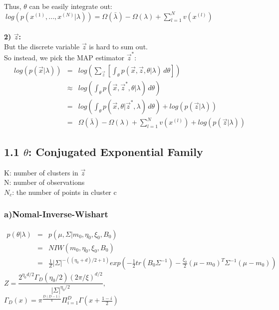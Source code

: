 \documentclass{article}
\begin{document}
\begin{spacing}{1.1}
Thus, $\theta$ can be easily integrate out:
$\ log(p(x^{(1)},...,x^{(N)}|\lambda))=\Omega(\bar \lambda)-\Omega(\lambda)+\sum_{l=1}^{N}v(x^{(l)})$\\ \\
\large {\bf 2) $\vec z$:}\\
But the discrete variable $\vec z$ is hard to sum out.\\
So instead, we pick the MAP estimator $\vec z^{*}$:\\
\begin{eqnarray*}
 log(p(\vec x|\lambda))
& = & log(\sum_{\vec z} [\int_\theta \! p(\vec x,\vec z,\theta|\lambda) \, d\theta]) \\
& \approx & log(\int_\theta \! p(\vec x,\vec z^{*},\theta|\lambda) \, d\theta) \\
& = &  log(\int_\theta \! p(\vec x,\theta|\vec z^{*},\lambda) \, d\theta)+log( p(\vec z|\lambda)) \\
& = &  \Omega(\bar \lambda)-\Omega(\lambda)+\sum_{l=1}^{N}v(x^{(l)})+log( p(\vec z|\lambda))
\end{eqnarray*}
 


\subsection{1.1  $\theta$: Conjugated Exponential Family}
K: number of clusters in $\vec z$ \\   
N: number of observations\\ 
$N_{c}$: the number of points in cluster c\\ 
\subsubsection*{a)Nomal-Inverse-Wishart}
\begin{eqnarray*} 
p(\theta|\lambda)
&=& p(\mu,\Sigma|m_{0},\eta_{0},\xi_{0},B_{0}) \\
&=&NIW(m_{0},\eta_{0},\xi_{0},B_{0}) \\
&=& \frac{1}{Z}\lvert\Sigma\lvert^{-((\eta_{0}+d)/2+1)}exp(-\frac{1}{2}tr(B_{0}\Sigma^{-1})-\frac{\xi_{0}}{2}(\mu-m_{0})^{T}\Sigma^{-1}(\mu-m_{0}))
\end{eqnarray*}
$Z=\dfrac{2^{\eta_{0}d/2}\Gamma_{D}(\eta_{0}/2)(2\pi/\xi)^{d/2}}{\lvert\Sigma\lvert^{\eta_{0}/2}},$\\
$\Gamma_{D}(x)=\pi^{\frac{D(D-1)}{4}}\Pi_{i=1}^{D}\Gamma(x+\frac{1-i}{2})$


\end{spacing}
\end{document}
